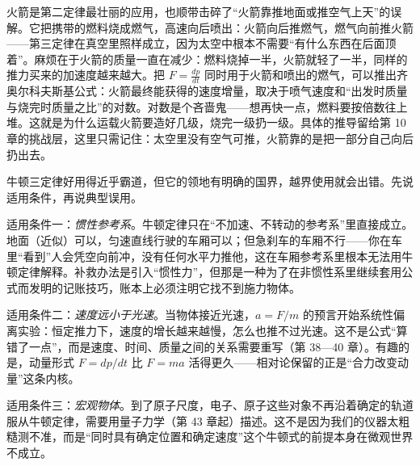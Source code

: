 \begin{center}
\end{center}

\begin{challenge}
火箭是第二定律最壮丽的应用，也顺带击碎了“火箭靠推地面或推空气上天”的误解。它把携带的燃料烧成燃气，高速向后喷出：火箭向后推燃气，燃气向前推火箭——第三定律在真空里照样成立，因为太空中根本不需要“有什么东西在后面顶着”。麻烦在于火箭的质量一直在减少：燃料烧掉一半，火箭就轻了一半，同样的推力买来的加速度越来越大。把 \(F=\frac{dp}{dt}\) 同时用于火箭和喷出的燃气，可以推出齐奥尔科夫斯基公式：火箭最终能获得的速度增量，取决于喷气速度和“出发时质量与烧完时质量之比”的对数。对数是个吝啬鬼——想再快一点，燃料要按倍数往上堆。这就是为什么运载火箭要造好几级，烧完一级扔一级。具体的推导留给第 10 章的挑战层，这里只需记住：太空里没有空气可推，火箭靠的是把一部分自己向后扔出去。
\end{challenge}


\begin{mainline}
牛顿三定律好用得近乎霸道，但它的领地有明确的国界，越界使用就会出错。先说适用条件，再说典型误用。

适用条件一：\emph{惯性参考系}。牛顿定律只在“不加速、不转动的参考系”里直接成立。地面（近似）可以，匀速直线行驶的车厢可以；但急刹车的车厢不行——你在车里“看到”人会凭空向前冲，没有任何水平力推他，这在车厢参考系里根本无法用牛顿定律解释。补救办法是引入“惯性力”，但那是一种为了在非惯性系里继续套用公式而发明的记账技巧，账本上必须注明它找不到施力物体。

适用条件二：\emph{速度远小于光速}。当物体接近光速，\(a=F/m\) 的预言开始系统性偏离实验：恒定推力下，速度的增长越来越慢，怎么也推不过光速。这不是公式“算错了一点”，而是速度、时间、质量之间的关系需要重写（第 38—40 章）。有趣的是，动量形式 \(F=dp/dt\) 比 \(F=ma\) 活得更久——相对论保留的正是“合力改变动量”这条内核。

适用条件三：\emph{宏观物体}。到了原子尺度，电子、原子这些对象不再沿着确定的轨道服从牛顿定律，需要用量子力学（第 43 章起）描述。这不是因为我们的仪器太粗糙测不准，而是“同时具有确定位置和确定速度”这个牛顿式的前提本身在微观世界不成立。
\end{mainline}

